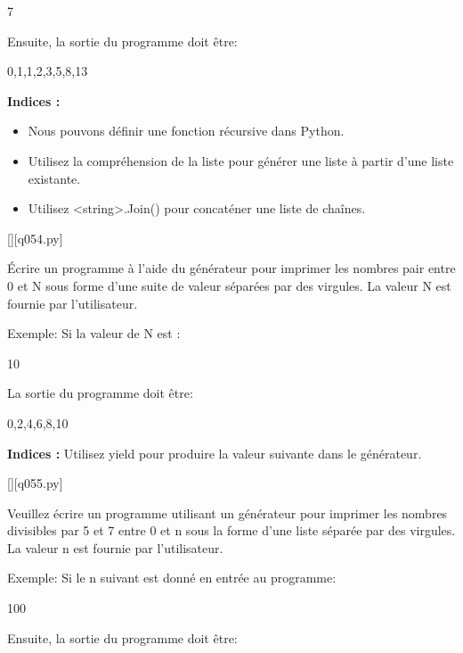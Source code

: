 7

Ensuite, la sortie du programme doit être:\newline

0,1,1,2,3,5,8,13
\par
\textbf{Indices : }
\begin{itemize}
\item Nous pouvons définir une fonction récursive dans Python.
\item Utilisez la compréhension de la liste pour générer une liste à partir d'une liste existante.
\item Utilisez <string>.Join() pour concaténer une liste de chaînes.
\end{itemize}
\renewcommand{\nomfichier}{q054.py}
\begin{solution}
    \pythonfile{\chemincode \nomfichier}[][\nomfichier]
\end{solution}

\question
Écrire un programme à l'aide du générateur pour imprimer les nombres pair entre 0 et N sous forme d'une suite de valeur séparées par des virgules. La valeur N est fournie par l'utilisateur.\newline

Exemple:\newline
Si la valeur de N est :\newline

10

La sortie du programme doit être:\newline

0,2,4,6,8,10
\par
\textbf{Indices : }Utilisez yield pour produire la valeur suivante dans le générateur.

\renewcommand{\nomfichier}{q055.py}
\begin{solution}
    \pythonfile{\chemincode \nomfichier}[][\nomfichier]
\end{solution}

\question
Veuillez écrire un programme utilisant un générateur pour imprimer les nombres divisibles par 5 et 7 entre 0 et n sous la forme d'une liste séparée par des virgules. La valeur n est fournie par l'utilisateur.\newline

Exemple:\newline
Si le n suivant est donné en entrée au programme:\newline

100

Ensuite, la sortie du programme doit être:\newline

